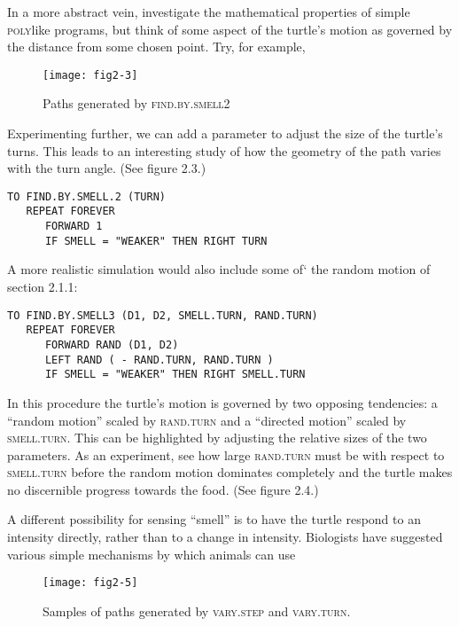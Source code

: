 \documentclass{book}
\begin{document}
In a more abstract vein, investigate the mathematical properties of
simple \textsc{poly}like programs, but think of some aspect of the turtle's motion
as governed by the distance from some chosen point. Try, for example,

\begin{figure}
\begin{center}
\texttt{[image: fig2-3]}
\caption{Paths generated by \textsc{find}\textsc{.by}\textsc{.smell2}}
\end{center}
\end{figure}

Experimenting further, we can add a parameter to adjust the size of the
turtle's turns. This leads to an interesting study of how the geometry
of the path varies with the turn angle. (See figure 2.3.)

\begin{verbatim}
TO FIND.BY.SMELL.2 (TURN)
   REPEAT FOREVER
      FORWARD 1
      IF SMELL = "WEAKER" THEN RIGHT TURN
\end{verbatim}
A more realistic simulation would also include some of` the random
motion of section 2.1.1:

\begin{verbatim}
TO FIND.BY.SMELL3 (D1, D2, SMELL.TURN, RAND.TURN)
   REPEAT FOREVER
      FORWARD RAND (D1, D2)
      LEFT RAND ( - RAND.TURN, RAND.TURN )
      IF SMELL = "WEAKER" THEN RIGHT SMELL.TURN
\end{verbatim}
In this procedure the turtle's motion is governed by two opposing tendencies: a ``random motion'' scaled by \textsc{rand.turn} and a ``directed motion'' scaled by \textsc{smell.turn}. This can be highlighted by adjusting the
relative sizes of the two parameters. As an experiment, see how large
\textsc{rand.turn} must be with respect to \textsc{smell.turn} before the random motion dominates completely and the turtle makes no discernible progress
towards the food. (See figure 2.4.)

A different possibility for sensing ``smell'' is to have the turtle respond
to an intensity directly, rather than to a change in intensity. Biologists
have suggested various simple mechanisms by which animals can use

\begin{figure}
\begin{center}
\texttt{[image: fig2-5]}
\caption{Samples of paths generated by \textsc{vary}\textsc{.step} and \textsc{vary}\textsc{.turn}.}
\end{center}
\end{figure}
\end{document}

